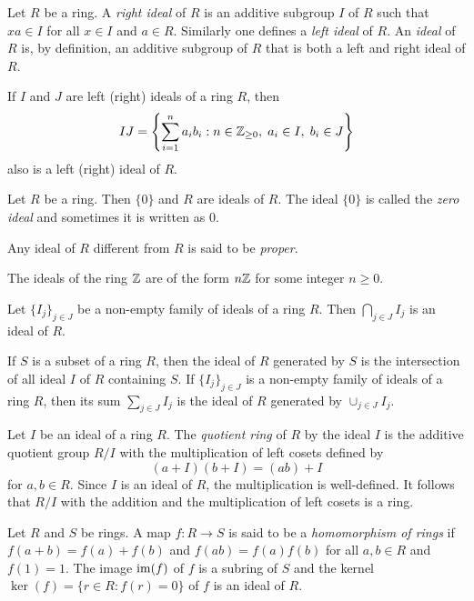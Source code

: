 Let $R$ be a ring. A \emph{right ideal} of $R$ is an additive subgroup $I$ of $R$ such that $xa\in I$ for all $x\in I$ and $a\in R$.
Similarly one defines a \emph{left ideal} 
of $R$. An {\em ideal} of $R$ is, by definition, an additive subgroup of $R$ that is
both a left and right ideal of $R$.


If $I$ and $J$ are left (right) ideals of a ring $R$, then
\[
IJ=\left\{\sum_{i=1}^{n} a_ib_i:n\in\mathbb{Z}_{\geq0},\; a_i\in I,\; b_i\in J\right\}
\]
also is a left (right) ideal of $R$.


\begin{example} 
    Let $R$ be a ring. Then $\{ 0\}$ and $R$ are ideals of $R$. The ideal $\{ 0\}$
    is called the {\em zero ideal} and sometimes it is written as $0$.
\end{example}

Any ideal of $R$ different from $R$ is said to be {\em proper}.

\begin{example}
    The ideals of the ring $\mathbb{Z}$ are of the form $n\mathbb{Z}$ for some integer $n\geq0$.
\end{example}

\begin{example} 
    Let $\{I_j\}_{j\in J}$ be a non-empty family of ideals of a ring $R$. Then $\bigcap_{j\in J}I_j$ is an ideal of $R$.
\end{example}

If $S$ is a subset of a ring $R$, then the ideal of $R$ generated by $S$ 
is the intersection of all ideal $I$ of $R$ containing $S$. If
$\{I_j\}_{j\in J}$ is a non-empty family of ideals of a ring $R$, then its sum $\sum_{j\in J}I_j$ is the ideal of $R$ generated by
$\cup_{j\in  J}I_j$.

Let $I$ be an ideal of a ring $R$. The {\em quotient ring} of $R$ by the ideal $I$ is the additive quotient group
$R/I$ with the multiplication of left cosets defined by 
\[
(a+I)(b+I)=(ab)+I
\]
for $a,b\in R$. Since $I$ is an ideal of $R$, the multiplication is well-defined. It follows that 
$R/I$ with the addition and the multiplication of left cosets is a ring.

Let $R$ and $S$ be rings. A map $f\colon R\rightarrow S$
is said to be a {\em homomorphism of rings} if 
$f(a+b)=f(a)+f(b)$ and $f(ab)=f(a)f(b)$ for all $a,b\in R$ and $f(1)=1$. 
The image $\operatorname{im}(f)$ of $f$ is a subring of $S$ and the kernel 
$\ker(f)=\{ r\in R: f(r)=0\}$ of $f$ is an ideal of $R$.

